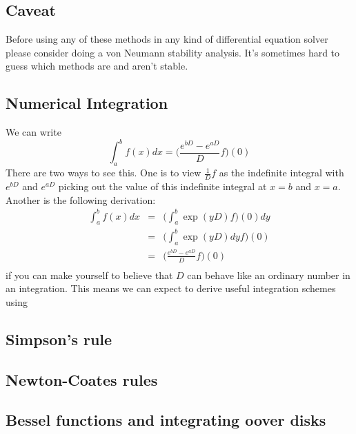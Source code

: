 \documentclass[a4paper]{article}
\theoremstyle{definition}
\begin{document}
\subsection{Caveat}
Before using any of these methods in any kind of differential equation solver please consider doing a von Neumann stability analysis.
It's sometimes hard to guess which methods are and aren't stable.

\subsection{Numerical Integration}
We can write
\[
\int_a^b f(x)dx = \Big(\frac{e^{bD}-e^{aD}}{D}f\Big)(0)
\]
There are two ways to see this.
One is to view $\frac{1}{D}f$ as the indefinite integral with $e^{bD}$ and $e^{aD}$ picking out the value of this indefinite integral at $x=b$ and $x=a$.
Another is the following derivation:
\begin{eqnarray*}
\int_a^b f(x)dx & = & \Big(\int_a^b\exp(yD)f\Big)(0) dy \\
& = & \Big(\int_a^b\exp(yD)dy f\Big)(0) \\
& = & \Big(\frac{e^{bD}-e^{aD}}{D}f\Big)(0) \\
\end{eqnarray*}
if you can make yourself to believe that $D$ can behave like an ordinary number in an integration.
This means we can expect to derive useful integration schemes using

\subsection{Simpson's rule}

\subsection{Newton-Coates rules}

\subsection{Bessel functions and integrating oover disks}



\end{document}

